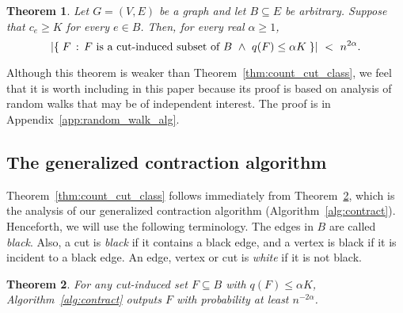 \documentclass[11pt]{article}
\numberwithin{equation}{section}
\newtheorem{theorem}{Theorem}[section]
\newcommand{\newterm}[1]{\textit{#1}}
\newcommand{\abs}[1]{\lvert #1 \rvert}
\newcommand{\card}[1]{\abs{#1}}
\newcommand{\Algorithm}[1]{Algorithm~\ref{alg:#1}}
\newcommand{\Appendix}[1]{Appendix~\ref{app:#1}}
\newcommand{\TheoremName}[1]{\label{thm:#1}}
\newcommand{\Theorem}[1]{Theorem~\ref{thm:#1}}
\begin{document}
\begin{theorem}
\TheoremName{count_cut_2}
Let $G=(V,E)$ be a graph and let $B \subseteq E$ be arbitrary.
Suppose that $c_e \geq K$ for every $e \in B$.
Then, for every real $\alpha \geq 1$,
$$
\card{ \setst{ F }{ F \text{\normalfont\ is a cut-induced subset of } B ~\wedge~ q(F) \leq \alpha K } }
~<~ n^{2\alpha}.
$$
\end{theorem}

Although this theorem is weaker than \Theorem{count_cut_class},
we feel that it is worth including in this paper because its proof is based on analysis of
random walks that may be of independent interest.
The proof is in \Appendix{random_walk_alg}.




\subsection{The generalized contraction algorithm}

\Theorem{count_cut_class} follows immediately from \Theorem{contract_with_split},
which is the analysis of our generalized contraction algorithm
(\Algorithm{contract}).
Henceforth, we will use the following terminology.
The edges in $B$ are called \newterm{black}.
Also, a cut is \newterm{black} if it contains a black edge,
and a vertex is black if it is incident to a black edge.
An edge, vertex or cut is \newterm{white} if it is not black.



\begin{theorem}
\TheoremName{contract_with_split}
For any cut-induced set $F \subseteq B$ with $q(F) \leq \alpha K$,
\Algorithm{contract} outputs $F$ with probability at least $n^{-2\alpha}$.
\end{theorem}
\end{document}
